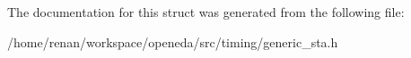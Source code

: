 The documentation for this struct was generated from the following file\-:\begin{DoxyCompactItemize}
\item 
/home/renan/workspace/openeda/src/timing/generic\-\_\-sta.\-h\end{DoxyCompactItemize}
